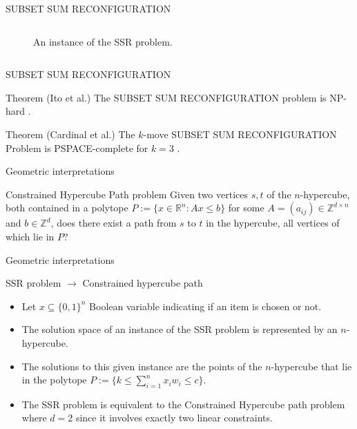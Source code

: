 \begin{frame}{SUBSET SUM RECONFIGURATION}
\begin{columns}
\begin{column}{0.5\textwidth}
\begin{figure}
                \caption{An instance of the SSR problem.\hfill \break}
                \label{fig:circle}
            \end{figure}
        \end{column}
    \end{columns}
\end{frame}


\begin{frame}{SUBSET SUM RECONFIGURATION}
   \begin{block}{Theorem (Ito et al.)}
   The SUBSET SUM RECONFIGURATION problem is NP-hard \cite{Ito11approximabilityof}.
   \end{block}
  
   \begin{block}{Theorem (Cardinal et al.)}
   The $k$-move SUBSET SUM RECONFIGURATION Problem is PSPACE-complete for $k = 3$ \cite{cardinal_reconfiguration_2018}.
   \end{block}
\end{frame}


\begin{frame}{Geometric interpretations}
    \begin{block}{Constrained Hypercube Path problem} Given two vertices $s, t$ of the $n$-hypercube, both contained in a polytope
    $P := \{x \in \mathbb{R}^n : Ax \leq b\}$ for some $A = (a_{ij}) \in \mathbb{Z}^{d \times n}$ and $b \in \mathbb{Z}^d$, does there exist a path from $s$ to $t$ in the hypercube, all vertices of which lie in $P$?
    \end{block}
\end{frame}

\begin{frame}{Geometric interpretations}
   \begin{block}{SSR problem $\rightarrow$ Constrained hypercube path}
       \begin{itemize}
           \item Let $x \subseteq \{0,1\}^n$ Boolean variable indicating if an item is chosen or not. 
           \item The solution space of an instance of the SSR problem is represented by an $n$-hypercube. 
           \item The solutions to this given instance are the points of the $n$-hypercube that lie in the polytope $P := \{k \leq \sum_{i=1}^{n} x_{i}w_{i} \leq c\}$.
           \item The SSR problem is equivalent to the 
           Constrained Hypercube path problem where $d = 2$ since it involves exactly two linear constraints. 
           
       \end{itemize}
   \end{block}
\end{frame}

